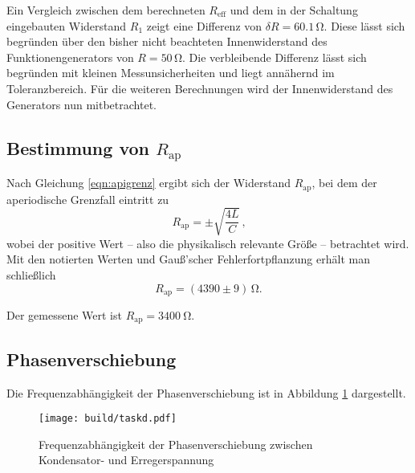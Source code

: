 Ein Vergleich zwischen dem berechneten $R_\text{eff}$ und dem in der Schaltung eingebauten Widerstand $R_\text{1}$ zeigt eine Differenz von $\delta R=60.1 \,\si{\ohm}$.
Diese lässt sich begründen über den bisher nicht beachteten Innenwiderstand des Funktionengenerators von $R=50\,\si{\ohm}$. Die verbleibende Differenz lässt sich begründen mit kleinen Messunsicherheiten und liegt annähernd im Toleranzbereich.
Für die weiteren Berechnungen wird der Innenwiderstand des Generators nun mitbetrachtet.

\subsection{Bestimmung von $R_{\text{ap}}$}

Nach Gleichung \eqref{eqn:apigrenz} ergibt sich der Widerstand $R_{\text{ap}}$, bei dem der
aperiodische Grenzfall eintritt zu
\begin{equation}
	R_{\text{ap}} = \pm \sqrt{\frac{4L}{C}} \, \text{,}
	\label{eqn:rap}
\end{equation}
wobei der positive Wert -- also die physikalisch relevante Größe -- betrachtet wird.
Mit den notierten Werten und Gauß'scher Fehlerfortpflanzung erhält man schließlich
\begin{equation*}
	R_{\text{ap}} = (4390 \pm 9) \, \si{\ohm} \text{.}
\end{equation*}

Der gemessene Wert ist $R_{\text{ap}} = \SI{3400}{\ohm}$.

\subsection{Phasenverschiebung}

Die Frequenzabhängigkeit der Phasenverschiebung ist in Abbildung \ref{fig:phasenplot} dargestellt.

\begin{figure}
	\centering
	\texttt{[image: build/taskd.pdf]}
	\caption{Frequenzabhängigkeit der Phasenverschiebung zwischen Kondensator- und Erregerspannung}
	\label{fig:phasenplot}
\end{figure}
